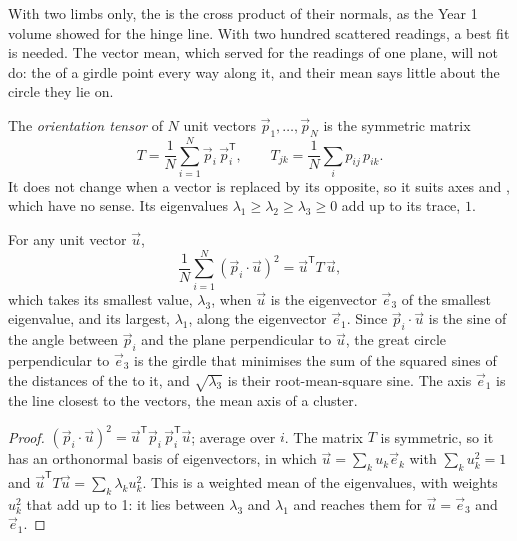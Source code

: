 With two limbs only, the  is the cross product of their normals, as
the Year 1 volume showed for the hinge line. With two hundred scattered
readings, a best fit is needed. The vector mean, which served for the readings
of one plane, will not do: the  of a girdle point every way along it, and
their mean says little about the circle they lie on.

\begin{definition}\label{def:b3:structural-analysis:orientation-tensor}
The \emph{orientation tensor} of $N$ unit vectors
$\vec p_1, \dots, \vec p_N$ is the symmetric matrix
\[
  T = \frac1N\sum_{i=1}^N \vec p_i\,\vec p_i^{\mathsf T},
  \qquad T_{jk} = \frac1N\sum_i p_{ij}\,p_{ik} .
\]
It does not change when a vector is replaced by its opposite, so it suits
axes and , which have no sense. Its eigenvalues $\lambda_1 \ge \lambda_2
\ge \lambda_3 \ge 0$ add up to its trace, $1$.
\end{definition}

\begin{theorem}\label{thm:b3:structural-analysis:tensor}
For any unit vector $\vec u$,
\[
  \frac1N\sum_{i=1}^N (\vec p_i\cdot\vec u)^2 = \vec u^{\mathsf T}T\,\vec u ,
\]
which takes its smallest value, $\lambda_3$, when $\vec u$ is the eigenvector
$\vec e_3$ of the smallest eigenvalue, and its largest, $\lambda_1$, along the
eigenvector $\vec e_1$. Since $\vec p_i\cdot\vec u$ is the sine of the angle
between $\vec p_i$ and the plane perpendicular to $\vec u$, the great circle
perpendicular to $\vec e_3$ is the girdle that minimises the sum of the squared
sines of the distances of the  to it, and $\sqrt{\lambda_3}$ is their
root-mean-square sine. The axis $\vec e_1$ is the line closest to the vectors,
the mean axis of a cluster.
\end{theorem}

\begin{proof}
$(\vec p_i\cdot\vec u)^2 = \vec u^{\mathsf T}\vec p_i\,\vec p_i^{\mathsf T}\vec
u$; average over $i$. The matrix $T$ is symmetric, so it has an orthonormal
basis of eigenvectors, in which $\vec u = \sum_k u_k\vec e_k$ with $\sum_k
u_k^2 = 1$ and $\vec u^{\mathsf T}T\vec u = \sum_k\lambda_k u_k^2$. This is a
weighted mean of the eigenvalues, with weights $u_k^2$ that add up to 1: it
lies between $\lambda_3$ and $\lambda_1$ and reaches them for $\vec u = \vec
e_3$ and $\vec e_1$.
\end{proof}

